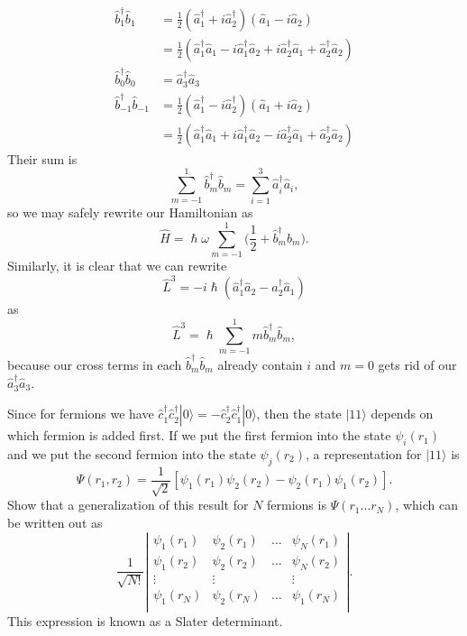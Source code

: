\documentclass[../qft-for-the-gifted-amateur.tex]{subfiles}
\begin{document}
\begin{questions}
\begin{solution}
	\begin{align*}
		{\hat{b}}_{1}^{\dagger}{\hat{b}}_{1} &= \frac{1}{2}({\hat{a}}_{1}^{\dagger} + i{\hat{a}}_{2}^{\dagger})({\hat{a}}_{1} - i{\hat{a}}_{2}) \\
					 &= \frac{1}{2}({\hat{a}}_{1}^{\dagger}{\hat{a}}_{1} - i{\hat{a}}_{1}^{\dagger}{\hat{a}}_{2} + i{\hat{a}}_{2}^{\dagger}{\hat{a}}_{1} + {\hat{a}}_{2}^{\dagger}{\hat{a}}_{2}) \\
		{\hat{b}}_{0}^{\dagger}{\hat{b}}_{0} &= {\hat{a}}_{3}^{\dagger}{\hat{a}}_{3} \\
		{\hat{b}}_{- 1}^{\dagger}{\hat{b}}_{- 1} &= \frac{1}{2}({\hat{a}}_{1}^{\dagger} - i{\hat{a}}_{2}^{\dagger})({\hat{a}}_{1} + i{\hat{a}}_{2}) \\
						   &= \frac{1}{2}({\hat{a}}_{1}^{\dagger}{\hat{a}}_{1} + i{\hat{a}}_{1}^{\dagger}{\hat{a}}_{2} - i{\hat{a}}_{2}^{\dagger}{\hat{a}}_{1} + {\hat{a}}_{2}^{\dagger}{\hat{a}}_{2})
	\end{align*}
	Their sum is
	\[
	\overset{1}{\sum_{m = - 1}}{\hat{b}}_{m}^{\dagger}{\hat{b}}_{m} = \overset{3}{\sum_{i = 1}}{\hat{a}}_{i}^{\dagger}{\hat{a}}_{i},
	\]
	so we may safely rewrite our Hamiltonian as
	\[
	\hat{H} = \hslash\omega\overset{1}{\sum_{m = - 1}}\Big(\frac{1}{2} + {\hat{b}}_{m}^{\dagger}{\hat{b}}_{m}\Big).
	\]
	Similarly, it is clear that we can rewrite
	\[
	{\hat{L}}^{3} = - i\hslash({\hat{a}}_{1}^{\dagger}{\hat{a}}_{2} - {\hat{a}}_{2}^{\dagger}{\hat{a}}_{1})
	\]
	as
	\[
	{\hat{L}}^{3} = \hslash\overset{1}{\sum_{m = - 1}}m{\hat{b}}_{m}^{\dagger}{\hat{b}}_{m},
	\]
	because our cross terms in each ${\hat{b}}_{m}^{\dagger}{\hat{b}}_{m}$ already contain $i$ and $m = 0$ gets rid of our ${\hat{a}}_{3}^{\dagger}{\hat{a}}_{3}$.
	\end{solution}

	\question Since for fermions we have ${\hat{c}}_{1}^{\dagger}{\hat{c}}_{2}^{\dagger}|0\rangle = - {\hat{c}}_{2}^{\dagger}{\hat{c}}_{1}^{\dagger}|0\rangle$, then the state $|11\rangle$ depends on which fermion is added first. If we put the first fermion into the state $\psi_{i}(r_{1})$ and we put the second fermion into the state $\psi_{j}(r_{2})$, a representation for $|11\rangle$ is
	\[
	\Psi(r_{1},r_{2}) = \frac{1}{\sqrt{2}}[\psi_{1}(r_{1})\psi_{2}(r_{2}) - \psi_{2}(r_{1})\psi_{1}(r_{2})].
	\]
	Show that a generalization of this result for $N$ fermions is
	$\Psi(r_{1}\ldots r_{N})$, which can be written out as
	\[
		\frac{1}{\sqrt{N!}}\left| \begin{matrix}
	\psi_{1}(r_{1}) & \psi_{2}(r_{1}) & \ldots & \psi_{N}(r_{1}) \\
	\psi_{1}(r_{2}) & \psi_{2}(r_{2}) & \ldots & \psi_{N}(r_{2}) \\
	 \vdots & \vdots & & \vdots \\
	\psi_{1}(r_{N}) & \psi_{2}(r_{N}) & \ldots & \psi_{1}(r_{N}) \\
	\end{matrix} \right|.
	\]
	This expression is known as a Slater determinant.
	

\end{questions}
\end{document}
